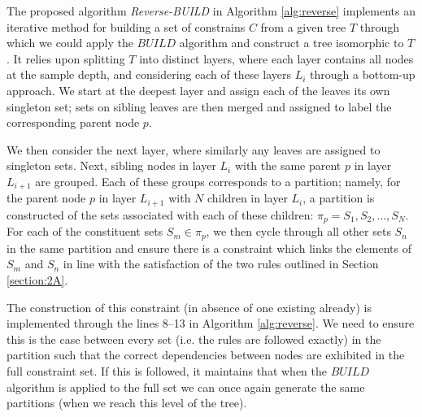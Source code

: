\documentclass[a4paper, 11pt]{article}
\begin{document}
	The proposed algorithm \emph{Reverse-BUILD} in Algorithm \ref{alg:reverse} implements an iterative method for building a set of constrains $C$ from a given tree $T$ through which we could apply the $BUILD$ algorithm and construct a tree isomorphic to $T$. It relies upon splitting $T$ into distinct layers, where each layer contains all nodes at the sample depth, and considering each of these layers $L_{i}$ through a bottom-up approach. We start at the deepest layer and assign each of the leaves its own singleton set; sets on sibling leaves are then merged and assigned to label the corresponding parent node $p$.
	
	We then consider the next layer, where similarly any leaves are assigned to singleton sets. Next, sibling nodes in layer $L_{i}$ with the same parent $p$ in layer $L_{i + 1}$ are grouped. Each of these groups corresponds to a partition; namely, for the parent node $p$ in layer $L_{i + 1}$ with $N$ children in layer $L_{i}$, a partition is constructed of the sets associated with each of these children: $\pi_{p} = S_{1}, S_{2}, \dots, S_{N}$. For each of the constituent sets $S_{m} \in \pi_{p}$, we then cycle through all other sets $S_{n}$ in the same partition and ensure there is a constraint which links the elements of $S_{m}$ and $S_{n}$ in line with the satisfaction of the two rules outlined in Section \ref{section:2A}.
	
	The construction of this constraint (in absence of one existing already) is implemented through the lines 8--13 in Algorithm \ref{alg:reverse}. We need to ensure this is the case between every set (i.e. the rules are followed exactly) in the partition such that the correct dependencies between nodes are exhibited in the full constraint set. If this is followed, it maintains that when the $BUILD$ algorithm is applied to the full set we can once again generate the same partitions (when we reach this level of the tree).
		
\end{document}
